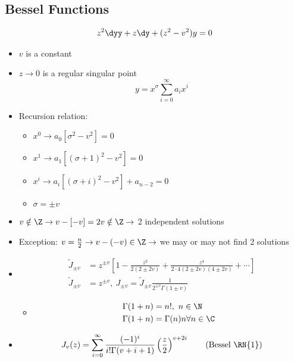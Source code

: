 \documentclass[Maths.tex]{subfiles}
\begin{document}
\chapter{}
\section{Bessel Functions}
\begin{align}
	z^2\dyy + z\dy + (z^2 - v^2)y = 0
\end{align}
\begin{itemize}
	\item $v$ is a constant
	\item $z \to 0$ is a regular singular point
	\begin{equation}
		y = x^\sigma \sum_{i=0}^\infty a_ix^i
	\end{equation}
	\item Recursion relation:
	\begin{itemize}
		\item $x^0 \to a_0[\sigma^2 - v^2] = 0$
		\item $x^1 \to a_1[(\sigma+1)^2 - v^2] = 0$
		\item $x^i \to a_i[(\sigma+i)^2 - v^2] + a_{n-2} = 0$
		\item $\sigma = \pm v$
	\end{itemize}
	\item $v \notin \Z \to v-[-v] = 2v \notin \Z \to$ 2 independent solutions
	\item Exception: $v = \frac{n}{2} \to v - (-v) \in \Z \to$ we may or may not find 2 solutions
	\item
	\begin{align}
		\tilde{J}_{\pm v} &= z^{\pm v}\left[1 - \frac{z^2}{2(2\pm2v)} + \frac{z^4}{2\cdot4(2\pm2v)(4\pm2v)} + \cdots\right] \\
		\tilde{J}_{\pm v} &= z^{\pm v},~ J_{\pm v} = \tilde{J}_{\pm v}\frac{1}{2^{\pm v}\Gamma(1\pm v)}
	\end{align}
	\begin{itemize}
		\item
		\begin{align}
			\Gamma(1+n) &= n!,~ n \in \N \\
			\Gamma(1+n) &= \Gamma(n)n \forall n \in \C
		\end{align}
	\end{itemize}
	\item
	\begin{equation}
		J_v(z) = \sum_{i=0}^\infty \frac{(-1)^i}{i!\Gamma(v+i+1)}\left(\frac{z}{2}\right)^{v+2i} \tag{Bessel \RN{1}}

\end{equation}
\end{itemize}
\end{document}

